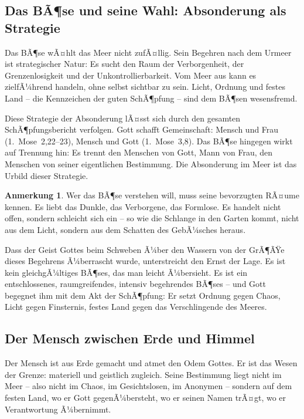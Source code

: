 ﻿\documentclass[a4paper,12pt]{article}
\theoremstyle{definition}
\newtheorem{remark}{Anmerkung}[section]
\begin{document}
\subsection{Das BÃ¶se und seine Wahl: Absonderung als Strategie}

Das BÃ¶se wÃ¤hlt das Meer nicht zufÃ¤llig. Sein Begehren nach dem Urmeer ist
strategischer Natur: Es sucht den Raum der Verborgenheit, der Grenzenlosigkeit
und der Unkontrollierbarkeit. Vom Meer aus kann es zielfÃ¼hrend handeln, ohne
selbst sichtbar zu sein. Licht, Ordnung und festes Land -- die Kennzeichen der
guten SchÃ¶pfung -- sind dem BÃ¶sen wesensfremd.

Diese Strategie der Absonderung lÃ¤sst sich durch den gesamten SchÃ¶pfungsbericht
verfolgen. Gott schafft Gemeinschaft: Mensch und Frau (1.~Mose~2,22--23), Mensch
und Gott (1.~Mose~3,8). Das BÃ¶se hingegen wirkt auf Trennung hin: Es trennt den
Menschen von Gott, Mann von Frau, den Menschen von seiner eigentlichen Bestimmung.
Die Absonderung im Meer ist das Urbild dieser Strategie.

\begin{remark}
    Wer das BÃ¶se verstehen will, muss seine bevorzugten RÃ¤ume kennen. Es liebt
    das Dunkle, das Verborgene, das Formlose. Es handelt nicht offen, sondern
    schleicht sich ein -- so wie die Schlange in den Garten kommt, nicht aus dem
    Licht, sondern aus dem Schatten des GebÃ¼sches heraus.
\end{remark}

Dass der Geist Gottes beim Schweben Ã¼ber den Wassern von der GrÃ¶ÃŸe dieses
Begehrens Ã¼berrascht wurde, unterstreicht den Ernst der Lage. Es ist kein
gleichgÃ¼ltiges BÃ¶ses, das man leicht Ã¼bersieht. Es ist ein entschlossenes,
raumgreifendes, intensiv begehrendes BÃ¶ses -- und Gott begegnet ihm mit dem
Akt der SchÃ¶pfung: Er setzt Ordnung gegen Chaos, Licht gegen Finsternis, festes
Land gegen das Verschlingende des Meeres.

\subsection{Der Mensch zwischen Erde und Himmel}

Der Mensch ist aus Erde gemacht und atmet den Odem Gottes. Er ist das Wesen der
Grenze: materiell und geistlich zugleich. Seine Bestimmung liegt nicht im Meer --
also nicht im Chaos, im Gesichtslosen, im Anonymen -- sondern auf dem festen Land,
wo er Gott gegenÃ¼bersteht, wo er seinen Namen trÃ¤gt, wo er Verantwortung Ã¼bernimmt.
\end{document}
